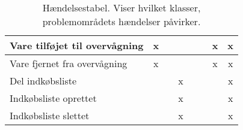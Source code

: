 \begin{table}[H]
\begin{tabular}{|l|l|c|c|c|c|c|c|c|}
      \multicolumn{2}{|l|}{Vare tilføjet til overvågning} & x                           &                            &                                   &                           &                               & x                         & x                           \\ \hline
      \multicolumn{2}{|l|}{Vare fjernet fra overvågning}  & x                           &                            &                                   &                           &                               & x                         & x                           \\ \hline
      \multicolumn{2}{|l|}{Del indkøbsliste}              &                             &                            & x                                 &                           &                               &                           & x                           \\ \hline
      \multicolumn{2}{|l|}{Indkøbsliste oprettet}         &                             &                            & x                                 &                           &                               &                           & x                           \\ \hline
      \multicolumn{2}{|l|}{Indkøbsliste slettet}          &                             &                            & x                                 &                           &                               &                           & x                           \\ \hline
    \end{tabular}
  \caption{Hændelsestabel. Viser hvilket klasser, problemområdets hændelser påvirker.}\label{tabel:haendelsestabel}
\end{table}
